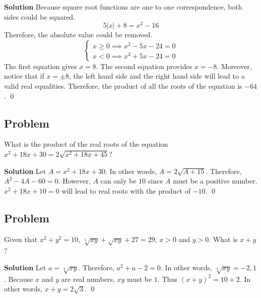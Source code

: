 \documentclass{article}
\newenvironment{solution}{\begin{trivlist}\item[]{\bf Solution}}{\qed \end{trivlist}}
\begin{document}
\begin{solution}
Because square root functions are one to one correspondence,
both sides could be squared.
\[
5|x| + 8 = x^2 - 16
\]
Therefore, the absolute value could be removed.
\[
\begin{cases}
    x \ge 0 \implies x^2 - 5x - 24 = 0 \\
    x < 0 \implies x^2 + 5x - 24 = 0
\end{cases}
\]
The first equation gives $x = 8$. The second equation
provides $x = -8$. Moreover, notice that if $x = \pm 8$,
the left hand side and the right hand side will lead to a
valid real equalities. Therefore, the product of all the
roots of the equation is $\boxed{-64}$.
\end{solution}

\subsection*{Problem}
What is the product of the real roots of the equation
$x^2 + 18x + 30 = 2\sqrt{x^2 + 18x + 45}$?

\begin{solution}
Let $A = x^2 + 18x + 30$. In other words,
$A = 2\sqrt{A + 15}$. Therefore, $A^2 - 4A - 60 = 0$.
However, $A$ can only be $10$ since $A$ must be a
positive number. $x^2 + 18x + 10 = 0$ will lead to real
roots with the product of $\boxed{-10}$.
\end{solution}

\subsection*{Problem}
Given that $x^2 + y^2 = 10$, $\sqrt[4]{xy} + \sqrt{xy}
+ 27 = 29$, $x > 0$ and $y > 0$. What is $x+y$?
\begin{solution}
Let $a = \sqrt[4]{xy}$. Therefore, $a^2 + a - 2 = 0$.
In other words, $\sqrt[4]{xy} = -2, 1$. Because $x$ and
$y$ are real numbers, $xy$ must be $1$. Thus
$(x + y)^2 = 10 + 2$. In other words, $x + y = \boxed{2\sqrt{3}}$.
\end{solution}
\end{document}
